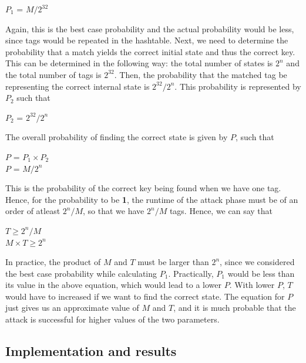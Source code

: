 \begin{center}
\large{$P_1$ = $M/2^{32}$}
\end{center}

Again, this is the best case probability and the actual probability would be less, since tags would be repeated in the hashtable. Next, we need to determine the probability that a match yields the correct initial state and thus the correct key. This can be determined in the following way: the total number of states is $2^n$ and the total number of tags is $2^{32}$. Then, the probability that the matched tag be representing the correct internal state is $2^{32}/2^n$. This probability is represented by $P_2$ such that

\begin{center}
\large{$P_2$ = $2^{32}/2^n$}
\end{center}

The overall probability of finding the correct state is given by $P$, such that

\begin{center}
\large{$P$ = $P_1 \times P_2$}\\
\large{$P$ = $M/2^{n}$}\\
\end{center}

This is the probability of the correct key being found when we have one tag. Hence, for the probability to be \textbf{1}, the runtime of the attack phase must be of an order of atleast $2^{n}/M$, so that we have $2^{n}/M$ tags. Hence, we can say that

\begin{center}
\large{$T \geq 2^{n}/M$}\\
\large{$M \times T \geq 2^{n}$}
\end{center}

In practice, the product of $M$ and $T$ must be larger than $2^n$, since we considered the best case probability while calculating $P_1$. Practically, $P_1$ would be less than its value in the above equation, which would lead to a lower $P$. With lower $P$, $T$ would have to increased if we want to find the correct state. The equation for $P$ just gives us an approximate value of $M$ and $T$, and it is much probable that the attack is successful for higher values of the two parameters.


\subsection{Implementation and results}

